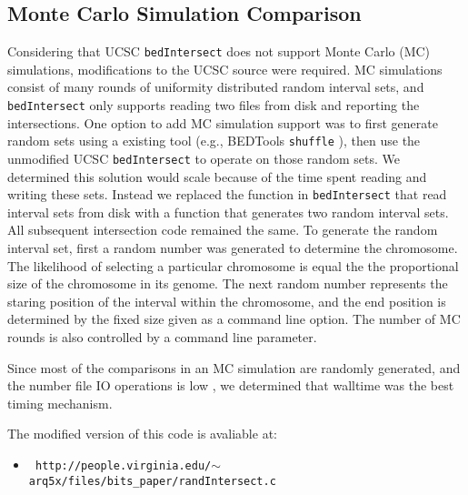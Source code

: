\subsection{Monte Carlo Simulation Comparison}
Considering that UCSC {\tt bedIntersect} does not support Monte Carlo (MC)
simulations, modifications to the UCSC source were required.  MC simulations
consist of many rounds of uniformity distributed random interval sets, and
{\tt bedIntersect} only supports reading two files from disk and reporting the
intersections.  One option to add MC simulation support was to first generate
random sets using a existing tool (e.g., BEDTools {\tt shuffle} ), then use
the unmodified UCSC {\tt bedIntersect} to operate on those random sets.  We
determined this solution would scale because of the time spent reading and
writing these sets.  Instead we replaced the function in {\tt bedIntersect} that
read interval sets from disk with a function that generates two random interval
sets.  All subsequent intersection code remained the same.  To generate the
random interval set, first a random number was generated to determine the
chromosome.  The likelihood of selecting a particular chromosome is equal the
the proportional size of the chromosome in its genome.  The next random number
represents the staring position of the interval within the chromosome, and the
end position is determined by the fixed size given as a command line option.
The number of MC rounds is also controlled by a command line parameter.

Since most of the comparisons in an MC simulation are randomly generated, and
the number file IO operations is low , we determined that walltime was the
best timing mechanism.

The modified version of this code is avaliable at:
\begin{itemize}
	\item {\tt
	http://people.virginia.edu/$\sim$arq5x/files/bits\_paper/randIntersect.c}
\end{itemize}
